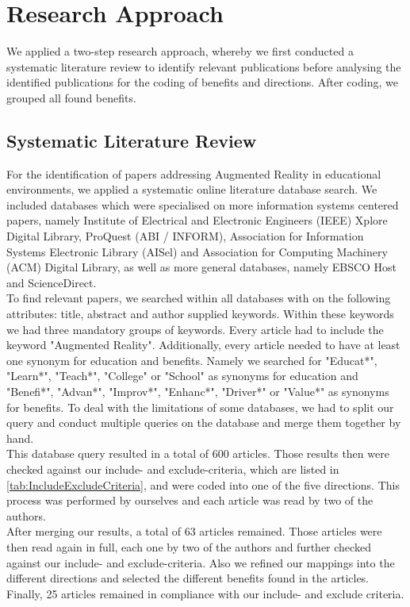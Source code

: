 \section{Research Approach}
We applied a two-step research approach, whereby we first conducted a systematic literature review to identify relevant publications before analysing the identified publications for the coding of benefits and directions. After coding, we grouped all found benefits.

\subsection{Systematic Literature Review}
For the identification of papers addressing Augmented Reality in educational environments, we applied a systematic online literature database search. We included databases which were specialised on more information systems centered papers, namely Institute of Electrical and Electronic Engineers (IEEE) Xplore Digital Library, ProQuest (ABI / INFORM), Association for Information Systems Electronic Library (AISel) and Association for Computing Machinery (ACM) Digital Library, as well as more general databases, namely EBSCO Host and ScienceDirect.\\
To find relevant papers, we searched within all databases with on the following attributes: title, abstract and author supplied keywords. Within these keywords we had three mandatory groups of keywords. Every article had to include the keyword "Augmented Reality". Additionally, every article needed to have at least one synonym for education and benefits. Namely we searched for "Educat*", "Learn*", "Teach*", "College" or "School" as synonyms for education and "Benefi*", "Advan*", "Improv*", "Enhanc*", "Driver*" or "Value*" as synonyms for benefits. To deal with the limitations of some databases, we had to split our query and conduct multiple queries on the database and merge them together by hand.\\
This database query resulted in a total of 600 articles. Those results then were checked against our include- and exclude-criteria, which are listed in \ref{tab:IncludeExcludeCriteria}, and were coded into one of the five directions. This process was performed by ourselves and each article was read by two of the authors.\\
After merging our results, a total of 63 articles remained. Those articles were then read again in full, each one by two of the authors and further checked against our include- and exclude-criteria. Also we refined our mappings into the different directions and selected the different benefits found in the articles.\\
Finally, 25 articles remained in compliance with our include- and exclude criteria.

